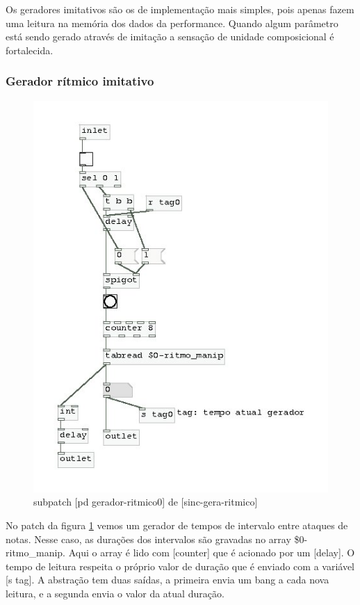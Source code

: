 \documentclass[draft]{ppgmus}
\begin{document}
Os geradores imitativos são os de implementação mais
simples, pois apenas fazem uma leitura na memória dos dados
da performance.
Quando algum parâmetro está sendo gerado através de imitação
a sensação de unidade composicional é fortalecida.



\subsubsection{Gerador rítmico imitativo}



\begin{figure}
\includegraphics[scale=.6]{gerador-ritmico0}
\caption{subpatch [pd gerador-ritmico0] de [sinc-gera-ritmico]}
\label{gera-ritmico0}
\end{figure}   


No patch da figura \ref{gera-ritmico0} vemos um gerador de tempos
de intervalo entre ataques de notas. Nesse caso, as durações dos intervalos
são gravadas no array \$0-ritmo\_manip. Aqui o array é lido com
[counter] que é acionado por um [delay]. O tempo de leitura respeita
o próprio valor de duração que é enviado com a variável [s tag].
A abstração tem duas saídas, a primeira envia um bang a cada nova 
leitura, e a segunda envia o valor da atual duração.
\end{document}
